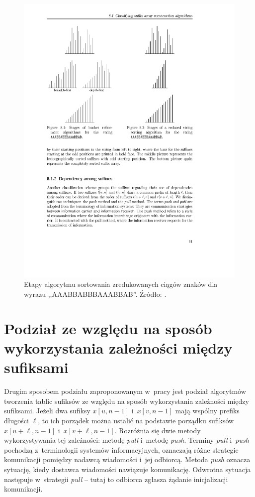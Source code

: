 \begin{figure}[t]
    \begin{center}
        \includegraphics[scale=0.75]{figures/reduced-string-sorting.pdf}
    \end{center}        
    \caption{Etapy algorytmu sortowania zredukowanych ciągów znaków dla wyrazu
    ,,AAABBABBBAAABBAB''. Źródło: \cite{schurmann-phd}.}%
    \label{rys:reduced-string-sorting}
\end{figure} 

\section{Podział ze względu na sposób wykorzystania zależności między sufiksami}

Drugim sposobem podziału zaproponowanym w~pracy \cite{schurmann-phd} jest
podział algorytmów tworzenia tablic sufiksów ze względu na sposób wykorzystania
zależności między sufiksami. Jeżeli dwa sufiksy $x[u,n-1]$ i~$x[v,n-1]$ mają
wspólny prefiks długości $\ell$, to ich porządek można ustalić na podstawie
porządku sufiksów $x[u+\ell,n-1]$ i~$x[v+\ell,n-1]$. Rozróżnia się dwie metody
wykorzystywania tej zależności: metodę \emph{pull} i~metodę
\emph{push}.
Terminy \emph{pull} i~\emph{push} pochodzą z~terminologii systemów
informacyjnych, oznaczają różne strategie komunikacji pomiędzy nadawcą
wiadomości i~jej odbiorcą. Metoda \emph{push} oznacza sytuację, kiedy dostawca
wiadomości nawiązuje komunikację. Odwrotna sytuacja następuje w~strategii
\emph{pull} -- tutaj to odbiorca zgłasza żądanie inicjalizacji komunikacji.

